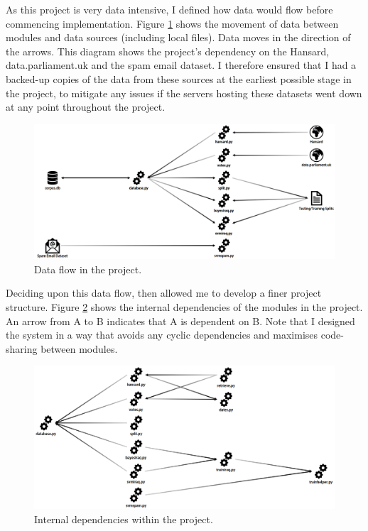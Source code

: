 \documentclass[12pt,a4paper,twoside,openright]{report}
\begin{document}
As this project is very data intensive, I defined how data would flow before commencing implementation. Figure \ref{fig:dataflow} shows the movement of data between modules and data sources (including local files). Data moves in the direction of the arrows. This diagram shows the project's dependency on the Hansard, data.parliament.uk and the spam email dataset. I therefore ensured that I had a backed-up copies of the data from these sources at the earliest possible stage in the project, to mitigate any issues if the servers hosting these datasets went down at any point throughout the project.
\newline
\begin{figure}
	\includegraphics[width=\linewidth]{figs/dataflow3.png}
	\caption{Data flow in the project.}
	\label{fig:dataflow}
\end{figure}

Deciding upon this data flow, then allowed me to develop a finer project structure. Figure \ref{fig:dependencies} shows the internal dependencies of the modules in the project. An arrow from A to B indicates that A is dependent on B. Note that I designed the system in a way that avoids any cyclic dependencies and maximises code-sharing between modules.

\begin{figure}
	\includegraphics[width=\linewidth]{figs/internaldependencies.png}
	\caption{Internal dependencies within the project.}
	\label{fig:dependencies}
\end{figure}
\end{document}
